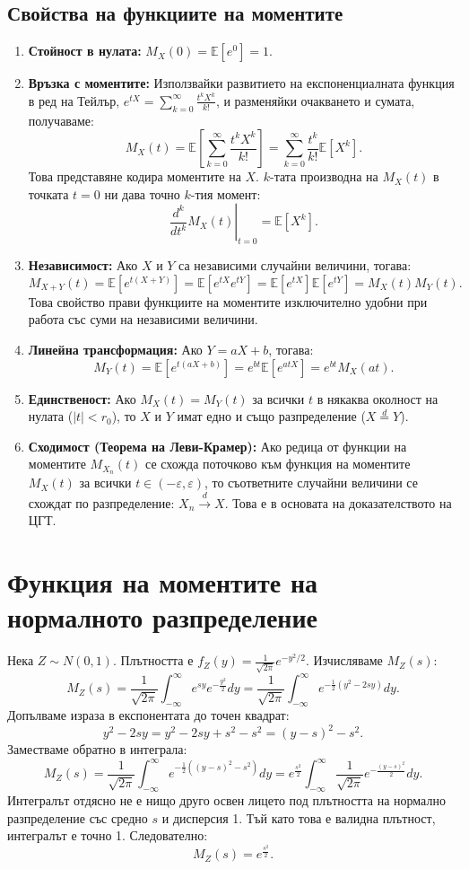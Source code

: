 \documentclass{article}
\begin{document}
\subsection{Свойства на функциите на моментите}

\begin{enumerate}
    \item \textbf{Стойност в нулата:} $M_X(0) = \mathbb{E}[e^0] = 1$.
    \item \textbf{Връзка с моментите:} Използвайки развитието на експоненциалната функция в ред на Тейлър, $e^{tX} = \sum_{k=0}^\infty \frac{t^k X^k}{k!}$, и разменяйки очакването и сумата, получаваме:
    \[ M_X(t) = \mathbb{E} \left[ \sum_{k=0}^\infty \frac{t^k X^k}{k!} \right] = \sum_{k=0}^\infty \frac{t^k}{k!} \mathbb{E}[X^k]. \]
    Това представяне кодира моментите на $X$. $k$-тата производна на $M_X(t)$ в точката $t=0$ ни дава точно $k$-тия момент:
    \[ \left. \frac{d^k}{dt^k} M_X(t) \right|_{t=0} = \mathbb{E}[X^k]. \]
    \item \textbf{Независимост:} Ако $X$ и $Y$ са независими случайни величини, тогава:
    \[ M_{X+Y}(t) = \mathbb{E}[e^{t(X+Y)}] = \mathbb{E}[e^{tX} e^{tY}] = \mathbb{E}[e^{tX}] \mathbb{E}[e^{tY}] = M_X(t) M_Y(t). \]
    Това свойство прави функциите на моментите изключително удобни при работа със суми на независими величини.
    \item \textbf{Линейна трансформация:} Ако $Y = aX + b$, тогава:
    \[ M_Y(t) = \mathbb{E}[e^{t(aX+b)}] = e^{bt} \mathbb{E}[e^{atX}] = e^{bt} M_X(at). \]
    \item \textbf{Единственост:} Ако $M_X(t) = M_Y(t)$ за всички $t$ в някаква околност на нулата ($|t| < r_0$), то $X$ и $Y$ имат едно и също разпределение ($X \stackrel{d}{=} Y$).
    \item \textbf{Сходимост (Теорема на Леви-Крамер):} Ако редица от функции на моментите $M_{X_n}(t)$ се схожда поточково към функция на моментите $M_X(t)$ за всички $t \in (-\varepsilon, \varepsilon)$, то съответните случайни величини се схождат по разпределение: $X_n \xrightarrow{d} X$. Това е в основата на доказателството на ЦГТ.
\end{enumerate}

\section{Функция на моментите на нормалното разпределение}

Нека $Z \sim N(0,1)$. Плътността е $f_Z(y) = \frac{1}{\sqrt{2\pi}} e^{-y^2/2}$. Изчисляваме $M_Z(s)$:
\[ M_Z(s) = \frac{1}{\sqrt{2\pi}} \int_{-\infty}^{\infty} e^{sy} e^{-\frac{y^2}{2}} dy = \frac{1}{\sqrt{2\pi}} \int_{-\infty}^{\infty} e^{-\frac{1}{2}(y^2 - 2sy)} dy. \]
Допълваме израза в експонентата до точен квадрат:
\[ y^2 - 2sy = y^2 - 2sy + s^2 - s^2 = (y-s)^2 - s^2. \]
Заместваме обратно в интеграла:
\[ M_Z(s) = \frac{1}{\sqrt{2\pi}} \int_{-\infty}^{\infty} e^{-\frac{1}{2}((y-s)^2 - s^2)} dy = e^{\frac{s^2}{2}} \int_{-\infty}^{\infty} \frac{1}{\sqrt{2\pi}} e^{-\frac{(y-s)^2}{2}} dy. \]
Интегралът отдясно не е нищо друго освен лицето под плътността на нормално разпределение със средно $s$ и дисперсия 1. Тъй като това е валидна плътност, интегралът е точно 1. Следователно:
\[ M_Z(s) = e^{\frac{s^2}{2}}. \]
\end{document}
